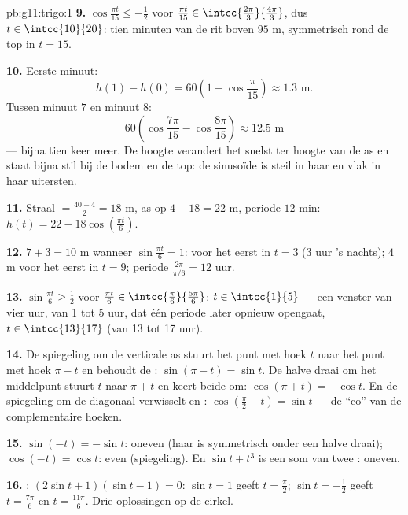 \begin{solution}{pb:g11:trigo:1}
\textbf{9.} $\cos\frac{\pi t}{15} \leq -\frac12$ voor
$\frac{\pi t}{15} \in \intcc{\frac{2\pi}{3}}{\frac{4\pi}{3}}$, dus
$t \in \intcc{10}{20}$: tien minuten van de rit boven $95$ m, symmetrisch
rond de top in $t = 15$.

\textbf{10.} Eerste minuut:
\[
h(1) - h(0) = 60\left(1 - \cos\frac{\pi}{15}\right)
\approx 1.3 \text{ m}.
\]
Tussen minuut $7$ en minuut $8$:
\[
60\left(\cos\frac{7\pi}{15} - \cos\frac{8\pi}{15}\right)
\approx 12.5 \text{ m}
\]
--- bijna tien keer meer. De hoogte verandert het snelst ter hoogte van de
as en staat bijna stil bij de bodem en de top: de sinusoïde is steil in haar
 en vlak in haar uitersten.

\textbf{11.} Straal $= \frac{40 - 4}{2} = 18$ m, as op $4 + 18 = 22$ m,
periode $12$ min: $h(t) = 22 - 18\cos\left(\frac{\pi t}{6}\right)$.

\textbf{12.}  $7 + 3 = 10$ m wanneer $\sin\frac{\pi t}{6} = 1$: voor
het eerst in $t = 3$ (3 uur 's nachts);  $4$ m voor het eerst in
$t = 9$; periode $\frac{2\pi}{\pi/6} = 12$ uur.

\textbf{13.} $\sin\frac{\pi t}{6} \geq \frac12$ voor
$\frac{\pi t}{6} \in \intcc{\frac\pi6}{\frac{5\pi}{6}}$: $t \in \intcc{1}{5}$
--- een venster van vier uur, van 1 tot 5 uur, dat één periode later opnieuw
opengaat, $t \in \intcc{13}{17}$ (van 13 tot 17 uur).

\textbf{14.} De spiegeling om de verticale as stuurt het punt met hoek $t$
naar het punt met hoek $\pi - t$ en behoudt de :
$\sin(\pi - t) = \sin t$. De halve draai om het middelpunt stuurt $t$ naar
$\pi + t$ en keert beide  om: $\cos(\pi + t) = -\cos t$. En de
spiegeling om de diagonaal verwisselt  en :
$\cos\left(\frac\pi2 - t\right) = \sin t$ --- de ``co'' van de
complementaire hoeken.

\textbf{15.} $\sin(-t) = -\sin t$: oneven (haar  is symmetrisch onder
een halve draai); $\cos(-t) = \cos t$: even (spiegeling). En
$\sin t + t^3$ is een som van twee : oneven.

\textbf{16.} : $(2\sin t + 1)(\sin t - 1) = 0$: $\sin t = 1$ geeft
$t = \frac\pi2$; $\sin t = -\frac12$ geeft $t = \frac{7\pi}{6}$ en
$t = \frac{11\pi}{6}$. Drie oplossingen op de cirkel.


\end{solution}
